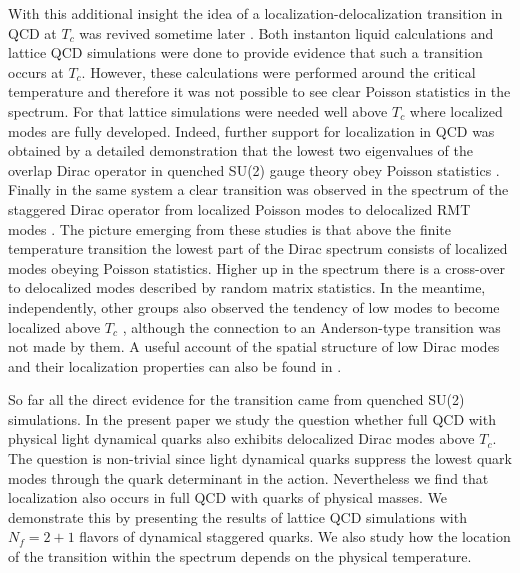 \documentclass[twocolumn, prd, preprintnumbers, amsmath,
  amssymb, showpacs, floatfix]{revtex4-1}
\begin{document}
With this additional insight the idea of a localization-delocalization
transition in QCD at $T_c$ was revived sometime later
\cite{GarciaGarcia:2004hi}. Both instanton liquid calculations
\cite{GarciaGarcia:2005vj} and lattice QCD simulations were
\cite{GarciaGarcia:2006gr} done to provide evidence that such a transition
occurs at $T_c$. However, these calculations were performed around the
critical temperature and therefore it was not possible to see clear Poisson
statistics in the spectrum. For that lattice simulations were needed well
above $T_c$ where localized modes are fully developed. Indeed, further support
for localization in QCD was obtained by a detailed demonstration that the
lowest two eigenvalues of the overlap Dirac operator in quenched SU(2) gauge
theory obey Poisson statistics \cite{Kovacs:2009zj}. Finally in the same
system a clear transition was observed in the spectrum of the staggered Dirac
operator from localized Poisson modes to delocalized RMT modes
\cite{Kovacs:2010wx}. The picture emerging from these studies is that above
the finite temperature transition the lowest part of the Dirac spectrum
consists of localized modes obeying Poisson statistics. Higher up in the
spectrum there is a cross-over to delocalized modes described by random matrix
statistics. In the meantime, independently, other groups also observed the
tendency of low modes to become localized above $T_c$ \cite{Gavai:2008xe},
although the connection to an Anderson-type transition was not made by them. A
useful account of the spatial structure of low Dirac modes and their
localization properties can also be found in \cite{deForcrand:2006my}.

So far all the direct evidence for the transition came from quenched SU(2)
simulations. In the present paper we study the question whether full QCD with
physical light dynamical quarks also exhibits delocalized Dirac modes above
$T_c$. The question is non-trivial since light dynamical quarks suppress the
lowest quark modes through the quark determinant in the action. Nevertheless
we find that localization also occurs in full QCD with quarks of physical
masses. We demonstrate this by presenting the results of lattice QCD
simulations with $N_f=2+1$ flavors of dynamical staggered quarks. We also
study how the location of the transition within the spectrum depends on the
physical temperature.
\end{document}
